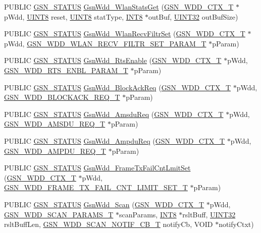 \begin{DoxyCompactItemize}
\item 
PUBLIC \hyperlink{a00660_gada5951904ac6110b1fa95e51a9ddc217}{GSN\_\-STATUS} \hyperlink{a00603_ae883bfd249a84f10d8f1f8fe7adbf1ce}{GsnWdd\_\-WlanStatsGet} (\hyperlink{a00108}{GSN\_\-WDD\_\-CTX\_\-T} $\ast$pWdd, \hyperlink{a00660_gab27e9918b538ce9d8ca692479b375b6a}{UINT8} reset, \hyperlink{a00660_gab27e9918b538ce9d8ca692479b375b6a}{UINT8} statType, \hyperlink{a00660_ga307b8734c020247f6bac4fcde0dcfbb9}{INT8} $\ast$outBuf, \hyperlink{a00660_gae1e6edbbc26d6fbc71a90190d0266018}{UINT32} outBufSize)
\item 
PUBLIC \hyperlink{a00660_gada5951904ac6110b1fa95e51a9ddc217}{GSN\_\-STATUS} \hyperlink{a00603_a1d9fc0409c65a27b5d601792251f03cc}{GsnWdd\_\-WlanRecvFiltrSet} (\hyperlink{a00108}{GSN\_\-WDD\_\-CTX\_\-T} $\ast$pWdd, \hyperlink{a00397}{GSN\_\-WDD\_\-WLAN\_\-RECV\_\-FILTR\_\-SET\_\-PARAM\_\-T} $\ast$pParam)
\item 
PUBLIC \hyperlink{a00660_gada5951904ac6110b1fa95e51a9ddc217}{GSN\_\-STATUS} \hyperlink{a00603_aed9ecd246f0e2b2cdda9f6e71d9fa7b5}{GsnWdd\_\-RtsEnable} (\hyperlink{a00108}{GSN\_\-WDD\_\-CTX\_\-T} $\ast$pWdd, \hyperlink{a00396}{GSN\_\-WDD\_\-RTS\_\-ENBL\_\-PARAM\_\-T} $\ast$pParam)
\item 
PUBLIC \hyperlink{a00660_gada5951904ac6110b1fa95e51a9ddc217}{GSN\_\-STATUS} \hyperlink{a00603_aec8c1766cfca1a67dc7bc9a77c9c442a}{GsnWdd\_\-BlockAckReq} (\hyperlink{a00108}{GSN\_\-WDD\_\-CTX\_\-T} $\ast$pWdd, \hyperlink{a00272}{GSN\_\-WDD\_\-BLOCKACK\_\-REQ\_\-T} $\ast$pParam)
\item 
PUBLIC \hyperlink{a00660_gada5951904ac6110b1fa95e51a9ddc217}{GSN\_\-STATUS} \hyperlink{a00603_a0793078f808af92c73408d6b97183f5f}{GsnWdd\_\-AmsduReq} (\hyperlink{a00108}{GSN\_\-WDD\_\-CTX\_\-T} $\ast$pWdd, \hyperlink{a00270}{GSN\_\-WDD\_\-AMSDU\_\-REQ\_\-T} $\ast$pParam)
\item 
PUBLIC \hyperlink{a00660_gada5951904ac6110b1fa95e51a9ddc217}{GSN\_\-STATUS} \hyperlink{a00603_a5a435905813e823c497bea2fa34c6e37}{GsnWdd\_\-AmpduReq} (\hyperlink{a00108}{GSN\_\-WDD\_\-CTX\_\-T} $\ast$pWdd, \hyperlink{a00269}{GSN\_\-WDD\_\-AMPDU\_\-REQ\_\-T} $\ast$pParam)
\item 
PUBLIC \hyperlink{a00660_gada5951904ac6110b1fa95e51a9ddc217}{GSN\_\-STATUS} \hyperlink{a00603_a79cc6d3eea377a30b71bc549ffe1d595}{GsnWdd\_\-FrameTxFailCntLmitSet} (\hyperlink{a00108}{GSN\_\-WDD\_\-CTX\_\-T} $\ast$pWdd, \hyperlink{a00381}{GSN\_\-WDD\_\-FRAME\_\-TX\_\-FAIL\_\-CNT\_\-LIMIT\_\-SET\_\-T} $\ast$pParam)
\item 
PUBLIC \hyperlink{a00660_gada5951904ac6110b1fa95e51a9ddc217}{GSN\_\-STATUS} \hyperlink{a00603_a0b805962b194131b997c0cd4102880c0}{GsnWdd\_\-Scan} (\hyperlink{a00108}{GSN\_\-WDD\_\-CTX\_\-T} $\ast$pWdd, \hyperlink{a00286}{GSN\_\-WDD\_\-SCAN\_\-PARAMS\_\-T} $\ast$scanParams, \hyperlink{a00660_ga307b8734c020247f6bac4fcde0dcfbb9}{INT8} $\ast$rsltBuff, \hyperlink{a00660_gae1e6edbbc26d6fbc71a90190d0266018}{UINT32} rsltBuffLen, \hyperlink{a00603_a4929f46818bd2e51f1d25fecc36d30d6}{GSN\_\-WDD\_\-SCAN\_\-NOTIF\_\-CB\_\-T} notifyCb, VOID $\ast$notifyCtxt)

\end{DoxyCompactItemize}
